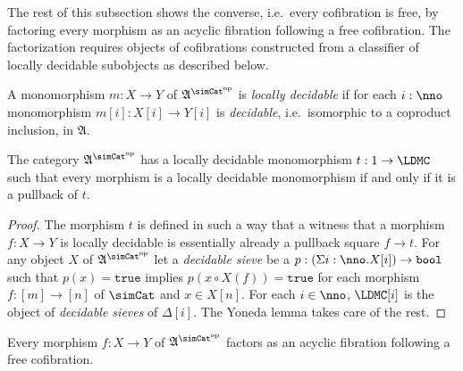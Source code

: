 \documentclass{tac}
\newcommand\hide[1]{}
\newcommand\dual{^{\mathrm{op}}}
\newcommand\s{^{\simCat\dual}}
\newcommand\of{:}
\newcommand\simplex\Delta
\newcommand\true{\mathtt{true}}
\newcommand\bool{\mathtt{bool}}
\newcommand\ambient{\mathfrak A}
\begin{document}
\hide{
Complete it. Show it works internally.
}

The rest of this subsection shows the converse, i.e.\ every cofibration is free, by factoring every morphism as an acyclic fibration following a free cofibration. The factorization requires objects of cofibrations constructed from a classifier of locally decidable subobjects as described below.

\begin{definition} A monomorphism $m\of X\to Y$ of $\ambient\s$ is \emph{locally decidable} if for each $i\of\nno$ monomorphism $m[i]\of X[i]\to Y[i]$ is \emph{decidable}, i.e.\ isomorphic to a coproduct inclusion, in $\ambient$. \end{definition}

\begin{lemma} The category $\ambient\s$ has a locally decidable monomorphism $t\of 1\to \LDMC$ such that every morphism is a locally decidable monomorphism if and only if it is a pullback of $t$. \end{lemma}

\begin{proof} The morphism $t$ is defined in such a way that a witness that a morphism $f\of X\to Y$ is locally decidable is essentially already a pullback square $f\to t$. For any object $X$ of $\ambient\s$ let a \emph{decidable sieve} be a $p\of(\Sigma i\of\nno.X[i])\to\bool$ such that $p(x)=\true$ implies $p(x\circ X(f))=\true$ for each morphism $f\of [m]\to [n]$ of $\simCat$ and $x\in X[n]$. For each $i\in\nno$, $\LDMC[i]$ is the object of \emph{decidable sieves} of $\simplex[i]$. The Yoneda lemma takes care of the rest. \end{proof}

\begin{proposition} Every morphism $f\of X\to Y$ of $\ambient\s$ factors as an acyclic fibration following a free cofibration. \label{factor1} \end{proposition}
\end{document}
